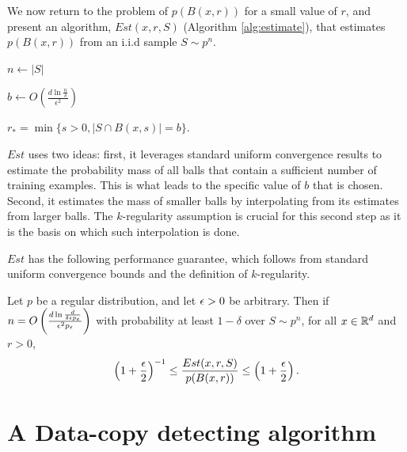We now return to the problem of $p(B(x, r))$ for a small value of $r$, and present an algorithm, $Est(x, r, S)$ (Algorithm \ref{alg:estimate}), that estimates $p(B(x, r))$ from an i.i.d sample $S \sim p^n$.

\begin{algorithm}
   \caption{$Est(x, r, S)$}
   \label{alg:estimate}

   \DontPrintSemicolon
   
	$n \leftarrow |S|$\;
	
   $b \leftarrow O\left(\frac{d \ln \frac{n}{\delta}}{\epsilon^2} \right)$\;
   
   $r_* = \min \{s > 0, |S \cap B(x, s)| = b\}$.\;
   

\end{algorithm}

$Est$ uses two ideas: first, it leverages standard uniform convergence results to estimate the probability mass of all balls that contain a sufficient number of training examples. This is what leads to the specific value of $b$ that is chosen. Second, it estimates the mass of smaller balls by interpolating from its estimates from larger balls. The $k$-regularity assumption is crucial for this second step as it is the basis on which such interpolation is done. 

$Est$ has the following performance guarantee, which follows from standard uniform convergence bounds and the definition of $k$-regularity. 
\begin{proposition}\label{prop:est_works}
Let $p$ be a regular distribution, and let $\epsilon >0$ be arbitrary. Then if $n = O\left(\frac{d\ln\frac{d}{\delta \epsilon p_\epsilon}}{\epsilon^2 p_\epsilon}\right)$ with probability at least $1 - \delta$ over $S \sim p^n$, for all $x \in \mathbb{R}^d$ and $r > 0$, $$\left(1+\frac{\epsilon}{2}\right)^{-1}\leq \frac{Est(x, r, S)}{p(B(x, r))} \leq \left(1+\frac{\epsilon}{2}\right).$$
\end{proposition}

\section{A Data-copy detecting algorithm}

